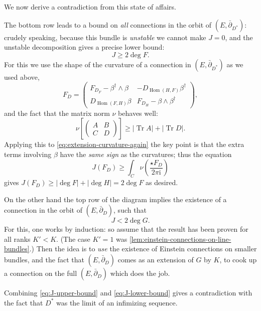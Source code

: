 \documentclass[12pt,letterpaper,reqno]{article}
\numberwithin{equation}{section}
\newcommand{\I}{{\mathrm i}}
\newcommand{\abs}[1]{\lvert#1\rvert}
\newcommand{\ti}[1]{\textit{#1}}
\DeclareMathOperator{\Tr}{Tr}
\DeclareMathOperator{\Hom}{Hom}
\newcommand{\fixme}[1]{{\color{orange}{[#1]}}}
\begin{document}
\begin{pf}
We now derive a contradiction from this state of affairs.

The bottom row leads to a bound on \ti{all} 
connections in the orbit of $(E,\bar\partial_{D^*})$:
crudely speaking, because this bundle is \ti{unstable}
we cannot make $J= 0$, and the unstable
decomposition gives a precise lower bound: 
\begin{equation} \label{eq:J-lower-bound}
  J \ge 2 \deg F.
\end{equation}
For this we use the shape of the 
curvature of a connection in $(E,\bar\partial_{D^*})$
as we used above,
\begin{equation} \label{eq:extension-curvature-again}
  F_D = \begin{pmatrix} F_{D_F} - \beta^\dagger \wedge \beta & - D_{\Hom(H,F)} \beta^\dagger \\ D_{\Hom(F,H)} \beta & F_{D_{H}} - \beta \wedge \beta^\dagger \end{pmatrix},
\end{equation}
and the fact that the matrix norm $\nu$ behaves well:
\begin{equation}
  \nu\left[\begin{pmatrix} A & B \\ C & D \end{pmatrix} \right] \ge \abs{\Tr A} + \abs{\Tr D}.
\end{equation}
Applying this to \eqref{eq:extension-curvature-again} the key point
is that the extra terms involving $\beta$ have the \ti{same sign}
as the curvatures; thus the equation
\begin{equation}
  J(F_D) \ge \int_C \nu\left(\frac{\star F_D}{2 \pi \I}\right)
\end{equation}
gives $J(F_D) \ge \abs{\deg F}+\abs{\deg H} = 2 \deg F$
as desired.

On the other hand the top row of the diagram implies the existence
of a connection in the orbit of $(E,\bar\partial_D)$,
such that
\begin{equation} \label{eq:J-upper-bound}
  J < 2 \deg G.
\end{equation}
For this, one works by induction: so assume that the 
result has been proven for all ranks $K'<K$.
(The case $K'=1$ was \autoref{lem:einstein-connections-on-line-bundles}.)
Then the idea is to \ti{use} the existence of Einstein connections on 
smaller bundles, and the fact that $(E,\bar\partial_D)$ 
comes as an extension of $G$ by $K$, 
to cook up a connection on the full $(E,\bar\partial_D)$
which does the job. \fixme{...}

Combining \eqref{eq:J-upper-bound} and \eqref{eq:J-lower-bound} 
gives a contradiction with the fact
that $D^*$ was the limit of an infimizing sequence.

\end{pf}
\end{document}
